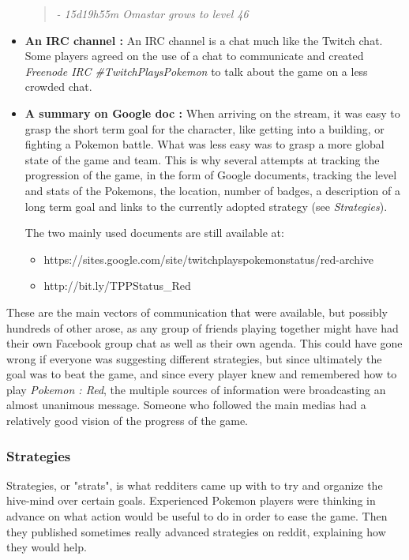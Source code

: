 \documentclass[a4paper]{article}
\begin{document}
\begin{itemize}
\begin{quote}
\textit{- 15d19h55m Omastar grows to level 46}
\end{quote}
\item \textbf{An IRC channel :}  An IRC channel is a chat much like the Twitch chat. Some players agreed on the use of a chat to communicate and created \textit{Freenode IRC \#TwitchPlaysPokemon} to talk about the game on a less crowded chat.
\item \textbf{A summary on Google doc :} When arriving on the stream, it was easy to grasp the short term goal for the character, like getting into a building, or fighting a Pokemon battle. What was less easy was to grasp a more global state of the game and team. This is why several attempts at tracking the progression of the game, in the form of Google documents, tracking the level and stats of the Pokemons, the location, number of badges, a description of a long term goal and links to the currently adopted strategy (see \textit{Strategies}).

The two mainly used documents are still available at:
  \begin{itemize}
    \item https://sites.google.com/site/twitchplayspokemonstatus/red-archive
    \item http://bit.ly/TPPStatus\_Red
  \end{itemize}
\end{itemize}
These are the main vectors of communication that were available, but possibly hundreds of other arose, as any group of friends playing together might have had their own Facebook group chat as well as their own agenda. This could have gone wrong if everyone was suggesting different strategies, but since ultimately the goal was to beat the game, and since every player knew and remembered how to play \textit{Pokemon : Red}, the multiple sources of information were broadcasting an almost unanimous message. Someone who followed the main medias had a relatively good vision of the progress of the game.

\subsubsection{Strategies}

Strategies, or "strats", is what redditers came up with to try and organize the hive-mind over certain goals. Experienced Pokemon players were thinking in advance on what action would be useful to do in order to ease the game. Then they published sometimes really advanced strategies on reddit, explaining how they would help.
\end{document}

